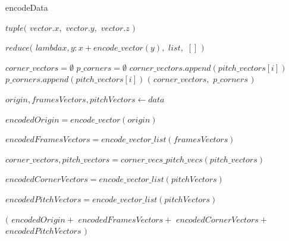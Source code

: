\documentclass[
11pt,
twoside
]{report}
\begin{document}
\begin{algorithm}
\begin{algorithmic}


\caption{encodeData}\label{alg:cap}

    \Return $tuple($
        \State \indent $vector.x,$
        \State \indent $vector.y,$
        \State \indent $vector.z$
    \State $)$
\EndProcedure

    \Return $reduce($
        \State \indent $lambda x, y: x + encode\_vector(y),$
        \State \indent $list,$
        \State \indent $[]$ 
    \State $)$
\EndProcedure


    \State $corner\_vectors = \emptyset$
    \State $p\_corners = \emptyset$
            \State $corner\_vectors.append(pitch\_vectors[i])$
        \Else
            \State $p\_corners.append(pitch\_vectors[i])$
        \EndIf
    \EndFor
    \State
    \Return $($
        \State $corner\_vectors,$
        \State $p\_corners$
    \State $)$
\EndProcedure

\State

    \State $origin, framesVectors, pitchVectors \gets data$

    \State

    \State $encodedOrigin = encode\_vector(origin)$

    \State $encodedFramesVectors = encode\_vector\_list(framesVectors)$

    \State $corner\_vectors, pitch\_vectors = corner\_vecs\_pitch\_vecs(pitch\_vectors)$

    \State $encodedCornerVectors = encode\_vector\_list(pitchVectors)$

    \State $encodedPitchVectors = encode\_vector\_list(pitchVectors)$

    \Return $($
        \State \indent $encodedOrigin +$
        \State \indent $encodedFramesVectors +$
        \State \indent $encodedCornerVectors +$
        \State \indent $encodedPitchVectors$
    \State $)$
\EndProcedure

\end{algorithmic}
\end{algorithm}
\end{document}
